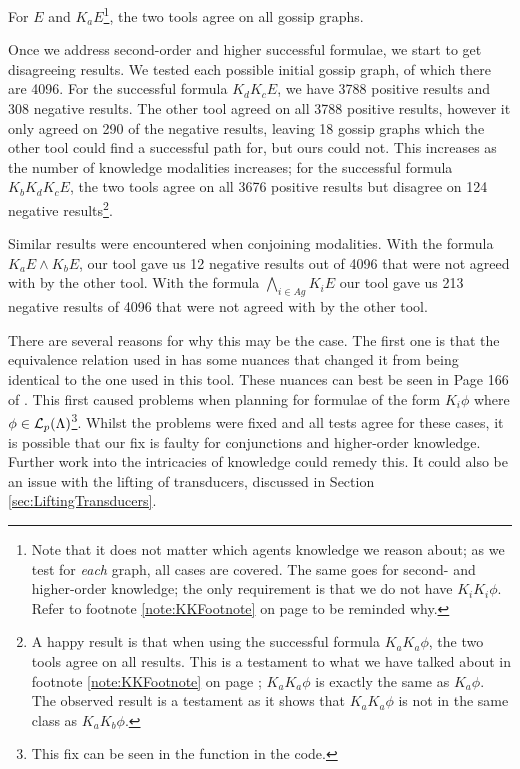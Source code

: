 \documentclass[10pt, a4paper]{report}
\begin{document}
For $E$ and $K_a E$\footnote{Note that it does not matter which agents knowledge
  we reason about; as we test for \emph{each} graph, all cases are covered. The
  same goes for second- and higher-order knowledge; the only requirement is that we do not
  have $K_i K_i \phi$. Refer to footnote \ref{note:KKFootnote} on page 
  \pageref{note:KKFootnote} to be reminded why.}, the two tools agree on all
gossip graphs.

Once we address second-order and higher successful formulae, we start to get
disagreeing results. We tested each possible initial gossip graph, of which
there are 4096. For the successful formula $K_d K_c E$, we have 3788 positive
results and 308 negative results. The other tool agreed on all 3788 positive
results, however it only agreed on 290 of the negative results, leaving 18
gossip graphs which the other tool could find a successful path for, but ours
could not. This increases as the number of knowledge modalities increases; for
the successful formula $K_b K_d K_c E$, the two tools agree on all 3676 positive
results but disagree on 124 negative results\footnote{A happy result is that
  when using the successful formula $K_a K_a \phi$, the two tools agree on all
  results. This is a testament to what we have talked about in footnote
  \ref{note:KKFootnote} on page \pageref{note:KKFootnote}; $K_a K_a \phi$ is
  exactly the same as $K_a \phi$. The observed result is a testament as it shows
that $K_a K_a \phi$ is not in the same class as $K_a K_b \phi$.}.

Similar results were encountered when conjoining modalities. With the formula
$K_a E \land K_b E$, our tool gave us 12 negative results out of 4096 that were
not agreed with by the other tool. With the formula $\bigwedge_{i \in Ag} K_i E$
our tool gave us 213 negative results of 4096 that were not agreed with by the
other tool.

There are several reasons for why this may be the case. The first one is that
the equivalence relation used in \cite{GithubGossip} has some nuances that
changed it from being identical to the one used in this tool. These nuances can
best be seen in Page 166 of \cite{SMCDEL}. This first caused problems when
planning for formulae of the form $K_i \phi$ where $\phi \in
\mathcal{L}_p(\Lambda)$\footnote{This fix can be seen in the 
  function in the code.}. Whilst the problems were fixed and all tests agree for
these cases, it is possible that our fix is faulty for conjunctions and
higher-order knowledge. Further work into the intricacies of knowledge could
remedy this. It could also be an issue with the lifting of transducers,
discussed in Section \ref{sec:LiftingTransducers}.  
\end{document}
